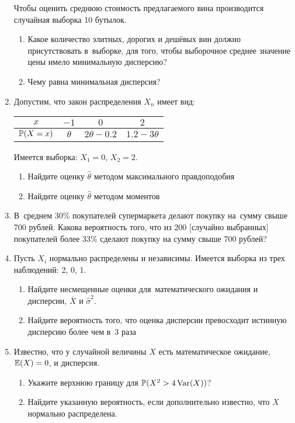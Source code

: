 \begin{enumerate}
Чтобы оценить среднюю стоимость предлагаемого вина производится
случайная выборка 10 бутылок.
\begin{enumerate}
\item Какое количество элитных, дорогих и дешёвых вин должно
присутствовать в~выборке, для того, чтобы выборочное среднее
значение цены имело минимальную дисперсию?
\item Чему равна минимальная дисперсия?
\end{enumerate}

\item Допустим, что закон распределения $X_{n}$ имеет вид:

\begin{tabular}{@{}cccc@{}}
\toprule
$x$      & $-1$     & $0$             & $2$             \\ \midrule
$\P(X=x)$ & $\theta$ & $2\theta - 0.2$ & $1.2 - 3\theta$ \\ \bottomrule
\end{tabular}


Имеется выборка: $X_{1}=0$, $X_{2}=2$.
\begin{enumerate}
\item Найдите оценку $\hat{\theta}$ методом максимального правдоподобия
\item Найдите оценку $\hat{\theta}$ методом моментов
\end{enumerate}

\item В~среднем 30\% покупателей супермаркета делают покупку на~сумму
свыше 700 рублей. Какова вероятность того, что из 200 $[$случайно
выбранных$]$ покупателей
более 33\% сделают покупку на сумму свыше 700 рублей?

\item Пусть $X_{i}$ нормально распределены и
независимы. Имеется выборка
из трех наблюдений: 2, 0, 1.
\begin{enumerate}
\item Найдите несмещенные оценки для~математического ожидания и
дисперсии, $\overline{X}$ и $\hat{\sigma}^{2}$.
\item Найдите вероятность того, что оценка дисперсии превосходит
истинную дисперсию более чем в~3 раза
\end{enumerate}

\item Известно, что у случайной величины $X$ есть
математическое
ожидание, $\E(X)=0$, и дисперсия.
\begin{enumerate}
\item Укажите верхнюю границу для $\P(X^{2}>4\Var(X))$?
\item Найдите указанную вероятность, если дополнительно известно, что
$X$ нормально распределена.
\end{enumerate}


\end{enumerate}
